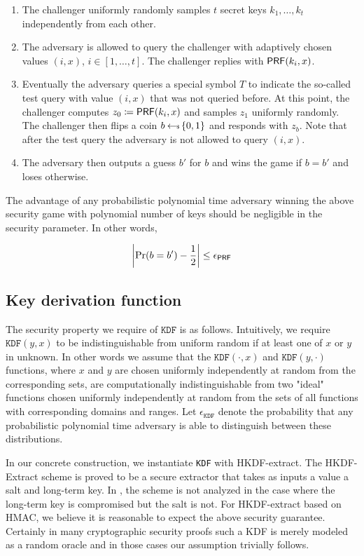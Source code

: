 \documentclass[12pt]{article}
\begin{document}
\begin{enumerate}
\item The challenger uniformly randomly samples $t$ secret keys $k_1,\ldots,k_t$ independently from each other.

\item The adversary is allowed to query the challenger with adaptively chosen values $(i,x)$, $i \in [1,\ldots,t]$. The challenger replies with $\mathsf{PRF}(k_i, x)$.

\item Eventually the adversary queries a special symbol $T$ to indicate the so-called test query with value $(i,x)$ that was not queried before. At this point, the challenger computes $z_0 \coloneqq \mathsf{PRF}(k_i, x)$ and samples $z_1$ uniformly randomly. The challenger then flips a coin $b \hskip2.3pt{\gets\!\!\mbox{\tiny${\$}$\normalsize}}\, \{0, 1\}$ and responds with $z_b$. Note that after the test query the adversary is not allowed to query $(i,x)$.

\item The adversary then outputs a guess $b'$ for $b$ and wins the game if $b = b'$ and loses otherwise.
\end{enumerate}

The advantage of any probabilistic polynomial time adversary winning the above security game with polynomial number of keys should be negligible in the security parameter. In other words,

$$
\left \vert \Pr(b = b') - \frac{1}{2} \right \vert \le \epsilon_{\mathsf{PRF}}
$$

\subsection{Key derivation function} \label{KDFdef}
The security property we require of $\texttt{KDF}$ is as follows. Intuitively, we require $\texttt{KDF}(y,x)$ to be indistinguishable from uniform random if at least one of $x$ or $y$ in unknown. In other words we assume that the $\texttt{KDF}(\cdot,x)$ and $\texttt{KDF}(y,\cdot)$ functions, where $x$ and $y$ are chosen uniformly independently at random from the corresponding sets, are computationally indistinguishable from two "ideal" functions chosen uniformly independently at random from the sets of all functions with corresponding domains and ranges.  Let $\epsilon_{\texttt{KDF}}$ denote the probability that any probabilistic polynomial time adversary is able to distinguish between these distributions.

In our concrete construction, we instantiate \texttt{KDF} with HKDF-extract. The HKDF-Extract scheme is proved to be a secure extractor that takes as inputs a value a salt and long-term key. In \cite{krawczyk2010cryptographic}, the scheme is not analyzed in the case where the long-term key is compromised but the salt is not. For HKDF-extract based on HMAC, we believe it is reasonable to expect the above security guarantee. Certainly in many cryptographic security proofs such a KDF is merely modeled as a random oracle and in those cases our assumption trivially follows.
\end{document}
